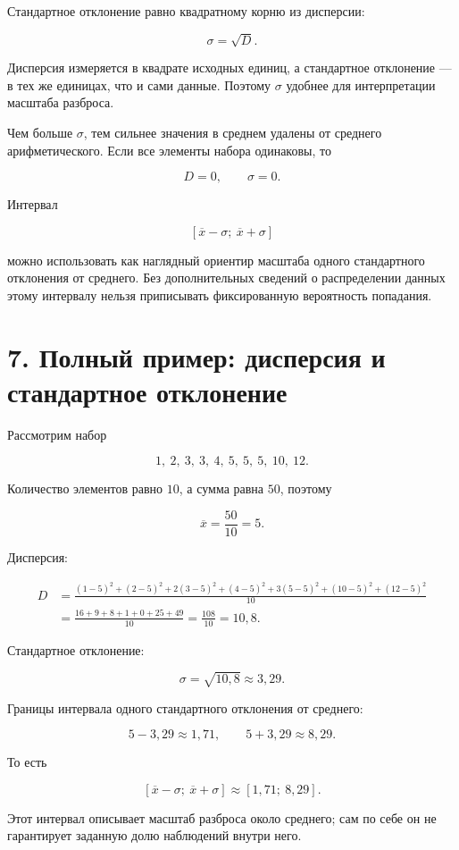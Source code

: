 \documentclass[a4paper,12pt]{article}
\begin{document}
Стандартное отклонение равно квадратному корню из дисперсии:

\[
\sigma=\sqrt{D}.
\]

Дисперсия измеряется в квадрате исходных единиц, а стандартное отклонение --- в тех же единицах, что и сами данные. Поэтому $\sigma$ удобнее для интерпретации масштаба разброса.

Чем больше $\sigma$, тем сильнее значения в среднем удалены от среднего арифметического. Если все элементы набора одинаковы, то

\[
D=0,
\qquad
\sigma=0.
\]

Интервал

\[
[\overline{x}-\sigma;\ \overline{x}+\sigma]
\]

можно использовать как наглядный ориентир масштаба одного стандартного отклонения от среднего. Без дополнительных сведений о распределении данных этому интервалу нельзя приписывать фиксированную вероятность попадания.

\section*{7. Полный пример: дисперсия и стандартное отклонение}

Рассмотрим набор

\[
1,\ 2,\ 3,\ 3,\ 4,\ 5,\ 5,\ 5,\ 10,\ 12.
\]

Количество элементов равно $10$, а сумма равна $50$, поэтому

\[
\overline{x}=\frac{50}{10}=5.
\]

Дисперсия:

\[
\begin{aligned}
D
&=
\frac{
(1-5)^2+(2-5)^2+2(3-5)^2+(4-5)^2
+3(5-5)^2+(10-5)^2+(12-5)^2
}{10}
\\[1mm]
&=
\frac{16+9+8+1+0+25+49}{10}
=
\frac{108}{10}
=
10{,}8.
\end{aligned}
\]

Стандартное отклонение:

\[
\sigma=\sqrt{10{,}8}\approx3{,}29.
\]

Границы интервала одного стандартного отклонения от среднего:

\[
5-3{,}29\approx1{,}71,
\qquad
5+3{,}29\approx8{,}29.
\]

То есть

\[
[\overline{x}-\sigma;\ \overline{x}+\sigma]
\approx
[1{,}71;\ 8{,}29].
\]

Этот интервал описывает масштаб разброса около среднего; сам по себе он не гарантирует заданную долю наблюдений внутри него.
\end{document}
